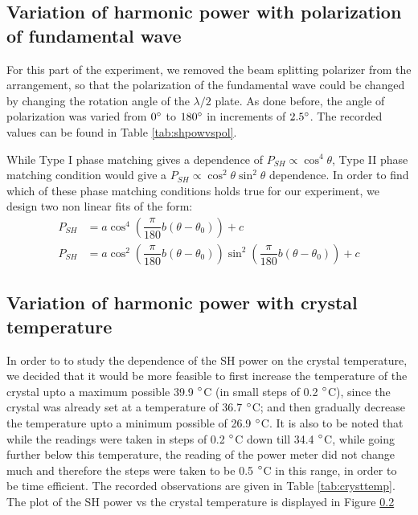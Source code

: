 \subsection{Variation of harmonic power with polarization of fundamental wave}
For this part of the experiment, we removed the beam splitting polarizer from the arrangement, so that the polarization of the fundamental wave could be changed by changing the rotation angle of the $\lambda/2$ plate. As done before, the angle of polarization was varied from $0 \degree$ to $180 \degree$ in increments of $2.5 \degree$. The recorded values can be found in Table \ref{tab:shpowvspol}. 

While Type I phase matching gives a dependence of $P_{SH}\propto \cos^{4}\theta$, Type II phase matching condition would give a $P_{SH}\propto \cos^{2}\theta\sin^{2}\theta$ dependence. In order to find which of these phase matching conditions holds true for our experiment, we design two non linear fits of the form:
\begin{align}
P_{SH}&=a\cos^{4}\left(\dfrac{\pi}{180}b(\theta-\theta_{0})\right)+c\\
P_{SH}&=a\cos^{2}\left(\dfrac{\pi}{180}b(\theta-\theta_{0})\right)\sin^{2}\left(\dfrac{\pi}{180}b(\theta-\theta_{0})\right)+c
\end{align}

\subsection{Variation of harmonic power with crystal temperature}
In order to to study the dependence of the SH power on the crystal temperature, we decided that it would be more feasible to first increase the temperature of the crystal upto a maximum possible 39.9 $\degree$C (in small steps of 0.2 $\degree$C), since the crystal was already set at a temperature of 36.7 $\degree$C; and then gradually decrease the temperature upto a minimum possible of 26.9 $\degree$C. It is also to be noted that while the readings were taken in steps of 0.2 $\degree$C down till 34.4 $\degree$C, while going further below this temperature, the reading of the power meter did not change much and therefore the steps were taken to be 0.5 $\degree$C in this range, in order to be time efficient. The recorded observations are given in Table \ref{tab:crysttemp}. The plot of the SH power vs the crystal temperature is displayed in Figure \ref{}
 
